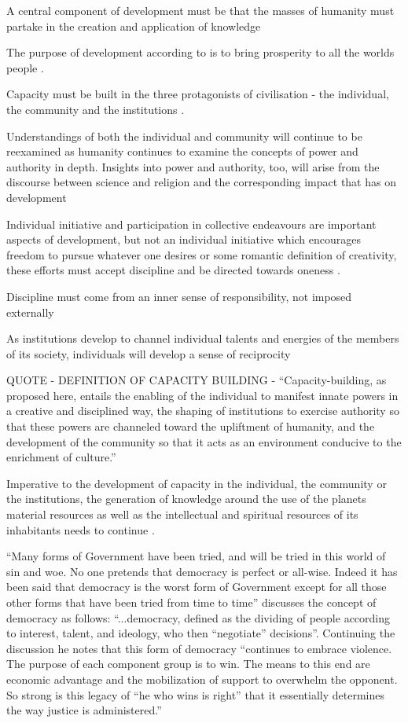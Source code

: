A central component of development must be that the masses of humanity must partake in the creation and application of knowledge \citep{Arbab2000}

The purpose of development according to \citet{Arbab2000} is to bring prosperity to all the worlds people \citep{Arbab2000}.

Capacity must be built in the three protagonists of civilisation - the individual, the community and the institutions \citep{Arbab2000}.

Understandings of both the individual and community will continue to be reexamined as humanity continues to examine the concepts of power and authority in depth. Insights into power and authority, too, will arise from the discourse between science and religion and the corresponding impact that has on development \citep{Arbab2000}

Individual initiative and participation in collective endeavours are important aspects of development, but not an individual initiative which encourages freedom to pursue whatever one desires or some romantic definition of creativity, these efforts must accept discipline and be directed towards oneness \citep{Arbab2000}. %

Discipline must come from an inner sense of responsibility, not imposed externally \citep{Arbab2000}

As institutions develop to channel individual talents and energies of the members of its society, individuals will develop a sense of reciprocity \citep{Arbab2000}

QUOTE - DEFINITION OF CAPACITY BUILDING - “Capacity-building, as proposed here, entails the enabling of the individual to manifest innate powers in a creative and disciplined way, the shaping of institutions to exercise authority so that these powers are channeled toward the upliftment of humanity, and the development of the community so that it acts as an environment conducive to the enrichment of culture.” \citep[][p213]{Arbab2000}

Imperative to the development of capacity in the individual, the community or the institutions, the generation of knowledge around the use of the planets material resources as well as the intellectual and spiritual resources of its inhabitants needs to continue \citep{Arbab2000}.

“Many forms of Government have been tried, and will be tried in this world of sin and woe. No one pretends that democracy is perfect or all-wise. Indeed it has been said that democracy is the worst form of Government except for all those other forms that have been tried from time to time” \cite{Churchill1947}  \citet[][p215]{Arbab2000} discusses the concept of democracy as follows: “...democracy, defined as the dividing of people according to interest, talent, and ideology, who then “negotiate” decisions”. Continuing the discussion he notes that this form of democracy “continues to embrace violence. The purpose of each component group is to win. The means to this end are economic advantage and the mobilization of support to overwhelm the opponent. So strong is this legacy of “he who wins is right” that it essentially determines the way justice is administered.”

